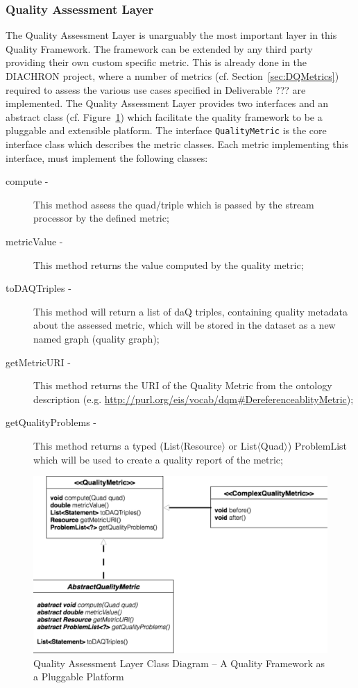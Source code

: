 \subsubsection{Quality Assessment Layer}
\label{sec:qaLayer}
The Quality Assessment Layer is unarguably the most important layer in this Quality Framework.
The framework can be extended by any third party providing their own custom specific metric.
This is already done in the DIACHRON project, where a number of metrics (cf. Section~\ref{sec:DQMetrics}) required to assess the various use cases specified in Deliverable ??? are implemented.
The Quality Assessment Layer provides two interfaces and an abstract class (cf. Figure~\ref{fig:classDiagram}) which facilitate the quality framework to be a pluggable and extensible platform.
The interface \texttt{QualityMetric} is the core interface class which describes the metric classes.
Each metric implementing this interface, must implement the following classes:
\begin{description}
\item[compute - ] This method assess the quad/triple which is passed by the stream processor by the defined metric;
\item[metricValue - ] This method returns the value computed by the quality metric;
\item[toDAQTriples - ] This method will return a list of daQ triples, containing quality metadata about the assessed metric, which will be stored in the dataset as a new named graph (quality graph);
\item[getMetricURI - ] This method returns the URI of the Quality Metric from the ontology description (e.g. \url{http://purl.org/eis/vocab/dqm#DereferenceablityMetric});
\item[getQualityProblems - ] This method returns a typed (List$\langle$Resource$\rangle$ or List$\langle$Quad$\rangle$) ProblemList which will be used to create a quality report of the metric;
\end{description}

\begin{figure}[tbph]
\center
\includegraphics[scale=0.3]{images/classdiagram.pdf} 
\caption{Quality Assessment Layer Class Diagram – A Quality Framework as a Pluggable Platform} 
\label{fig:classDiagram}
\end{figure}

